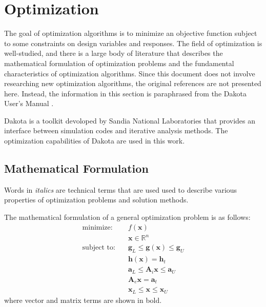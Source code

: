 \section{Optimization}
\label{sec:bg:opt}

The goal of optimization algorithms is to minimize an objective function subject to some constraints on design variables and responses.
The field of optimization is well-studied, and there is a large body of literature that describes the mathematical formulation of optimization problems and the fundamental characteristics of optimization algorithms.
Since this document does not involve researching new optimization algorithms, the original references are not presented here.
Instead, the information in this section is paraphrased from the Dakota User's Manual \cite{dakota}.

Dakota is a toolkit devoloped by Sandia National Laboratories that provides an interface between simulation codes and iterative analysis methods.
The optimization capabilities of Dakota are used in this work.

\subsection{Mathematical Formulation}
\label{sec:bg:opt:math}

Words in \textit{italics} are technical terms that are used used to describe various properties of optimization problems and solution methods.

The mathematical formulation of a general optimization problem is as follows:
\begin{equation}\begin{split}\label{eq:bg:opt:optimization_problem}
  \mbox{minimize:}  \quad & f\left(\textbf{x}\right) \\
                          & \textbf{x} \in \mathbb{R}^n \\
  \mbox{subject to:}\quad & \textbf{g}_L \leq \textbf{g}\left(\textbf{x}\right) \leq \textbf{g}_U \\
                          & \textbf{h}\left(\textbf{x}\right) = \textbf{h}_t \\
                          & \textbf{a}_L \leq \textbf{A}_i\textbf{x} \leq \textbf{a}_U \\
                          & \textbf{A}_e\textbf{x} = \textbf{a}_t \\
                          & \textbf{x}_L \leq \textbf{x} \leq \textbf{x}_U
\end{split}\end{equation}
where vector and matrix terms are shown in bold.

